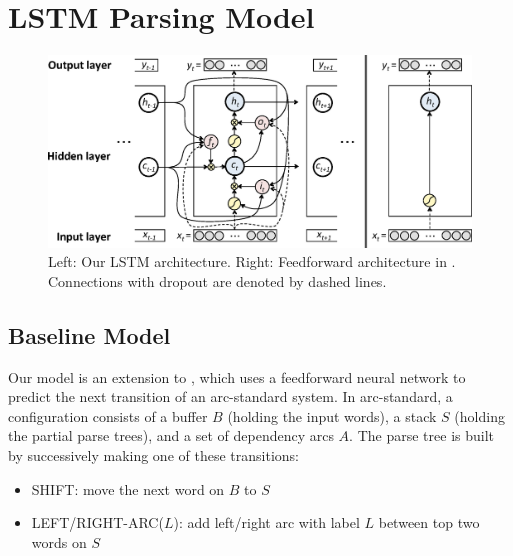 \section{LSTM Parsing Model}

\begin{figure}[t]
\setlength\belowcaptionskip{-1em}
\centering
\captionsetup{justification=centering}
  \begin{center}
    \includegraphics[width=0.85\linewidth]{images/fig_model.eps}
  \end{center}
  \setlength{}
  \caption{Left: Our LSTM architecture. Right: Feedforward architecture in . Connections with dropout are denoted by dashed lines.}
\label{fig:model}
\end{figure}

\subsection{Baseline Model}
Our model is an extension to ,
which uses a feedforward neural network to predict the next transition of an arc-standard system.
In arc-standard, a configuration consists of a buffer $B$ (holding the input words), a stack $S$ (holding the partial parse trees), and a set of dependency arcs $A$.
The parse tree is built by successively making one of these transitions: 
\vspace{-.5em}
\begin{itemize}
\item SHIFT: move the next word on $B$ to $S$
\vspace{-.4em}
\item LEFT/RIGHT-ARC($L$): add left/right arc with label $L$ between top two words on $S$%
\end{itemize}
\vspace{-.5em}

